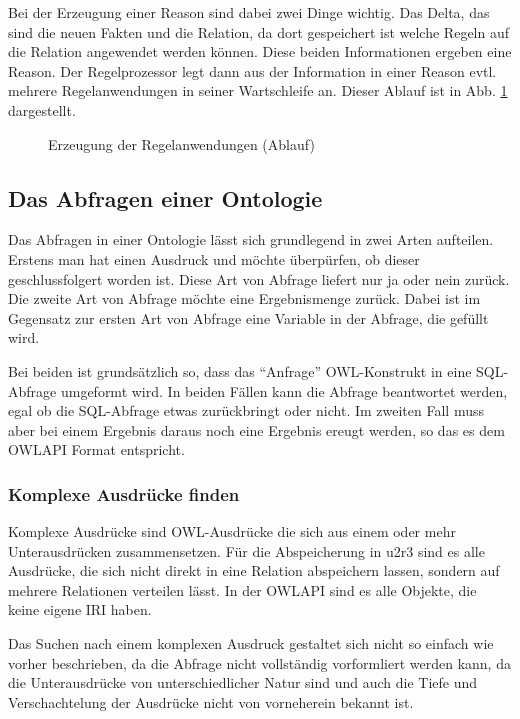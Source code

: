 Bei der Erzeugung einer Reason sind dabei zwei Dinge wichtig. Das Delta, das sind die neuen Fakten und die Relation, da dort gespeichert ist welche Regeln auf die Relation angewendet werden können. Diese beiden Informationen ergeben eine Reason. Der Regelprozessor legt dann aus der Information in einer Reason evtl. mehrere Regelanwendungen in seiner Wartschleife an. Dieser Ablauf ist in Abb. \ref{diagram-ruleexecution2} dargestellt.

\begin{figure}[htp]
\begin{center}
  \caption{Erzeugung der Regelanwendungen (Ablauf)}
  \label{diagram-ruleexecution2}
\end{center}
\end{figure}

\subsection{Das Abfragen einer Ontologie}
Das Abfragen in einer Ontologie lässt sich grundlegend in zwei Arten aufteilen. Erstens man hat einen Ausdruck und möchte überpürfen, ob dieser geschlussfolgert worden ist. Diese Art von Abfrage liefert nur ja oder nein zurück. Die zweite Art von Abfrage möchte eine Ergebnismenge zurück. Dabei ist im Gegensatz zur ersten Art von Abfrage eine Variable in der Abfrage, die gefüllt wird.

Bei beiden ist grundsätzlich so, dass das ``Anfrage'' OWL-Konstrukt in eine SQL-Abfrage umgeformt wird. In beiden Fällen kann die Abfrage beantwortet werden, egal ob die SQL-Abfrage etwas zurückbringt oder nicht. Im zweiten Fall muss aber bei einem Ergebnis daraus noch eine Ergebnis ereugt werden, so das es dem OWLAPI Format entspricht.

\subsubsection{Komplexe Ausdrücke finden}

Komplexe Ausdrücke sind OWL-Ausdrücke die sich aus einem oder mehr Unterausdrücken zusammensetzen. Für die Abspeicherung in u2r3 sind es alle Ausdrücke, die sich nicht direkt in eine Relation abspeichern lassen, sondern auf mehrere Relationen verteilen lässt. In der OWLAPI sind es alle Objekte, die keine eigene IRI haben.

Das Suchen nach einem komplexen Ausdruck gestaltet sich nicht so einfach wie vorher beschrieben, da die Abfrage nicht vollständig vorformliert werden kann, da die Unterausdrücke von unterschiedlicher Natur sind und auch die Tiefe und Verschachtelung der Ausdrücke nicht von vorneherein bekannt ist.

